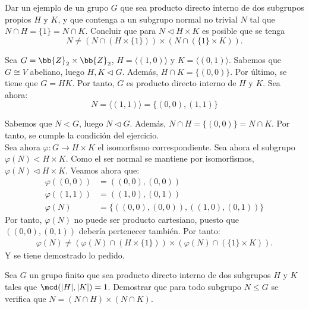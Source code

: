\begin{ejercicio}
    Dar un ejemplo de un grupo $G$ que sea producto directo interno de dos subgrupos propios $H$ y $K$, y que contenga a un subgrupo normal no trivial $N$ tal que $N\cap H=\{1\}=N\cap K$. Concluir que para $N\lhd H\times K$ es posible que se tenga
    \[
        N\neq (N\cap (H\times \{1\}))\times (N\cap (\{1\}\times K)).
    \]

    Sea $G=\bb{Z}_2\times \bb{Z}_2$, $H=\langle(1,0)\rangle$ y $K=\langle(0,1)\rangle$.
    Sabemos que $G\cong V$ abeliano, luego $H,K\lhd G$. Además, $H\cap K=\{(0,0)\}$. Por último, se tiene que $G=HK$. Por tanto, $G$ es producto directo interno de $H$ y $K$. Sea ahora:
    \begin{equation*}
        N=\langle(1,1)\rangle = \{(0,0),(1,1)\}
    \end{equation*}

    Sabemos que $N<G$, luego $N\lhd G$. Además, $N\cap H=\{(0,0)\}=N\cap K$. Por tanto, se cumple la condición del ejercicio.\\

    Sea ahora $\varphi:G\to H\times K$ el isomorfismo correspondiente. Sea ahora el subgrupo $\varphi(N)<H\times K$. Como el ser normal se mantiene por isomorfismos, $\varphi(N)\lhd H\times K$. Veamos ahora que:
    \begin{align*}
        \varphi((0,0))&=((0,0),(0,0))\\
        \varphi((1,1))&=((1,0),(0,1))\\
        \varphi(N) &= \{((0,0),(0,0)),((1,0),(0,1))\}
    \end{align*}
    Por tanto, $\varphi(N)$ no puede ser producto cartesiano, puesto que $((0,0),(0,1))$ debería pertenecer también. Por tanto:
    \begin{align*}
        \varphi(N)\neq (\varphi(N)\cap (H\times \{1\}))\times (\varphi(N)\cap (\{1\}\times K)).
    \end{align*}
    Y se tiene demostrado lo pedido.
\end{ejercicio}

\begin{ejercicio}
    Sea $G$ un grupo finito que sea producto directo interno de dos subgrupos $H$ y $K$ tales que $\mcd(|H|,|K|)=1$. Demostrar que para todo subgrupo $N\leq G$ se verifica que $N=(N\cap H)\times (N\cap K)$.

\end{ejercicio}

